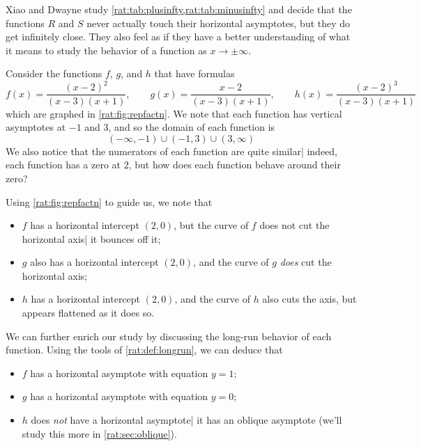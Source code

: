 \begin{pccexample}
		 Xiao and Dwayne study \cref{rat:tab:plusinfty,rat:tab:minusinfty} and decide that
		 the functions $R$ and $S$ never actually touch their horizontal asymptotes, but they
		 do get infinitely close. They also feel as if they have a better understanding of
		 what it means to study the behavior of a function as $x\rightarrow\pm\infty$.
	 \end{pccexample}

	 \begin{pccexample}
		 Consider the functions $f$, $g$, and $h$ that have formulas
		 \[
			 f(x)=\frac{(x-2)^2}{(x-3)(x+1)}, \qquad g(x)=\frac{x-2}{(x-3)(x+1)}, \qquad h(x)=\frac{(x-2)^3}{(x-3)(x+1)}
		 \]
		 which are graphed in \cref{rat:fig:repfactn}. We note that each function has vertical
		 asymptotes at $-1$ and $3$, and so the domain of each function is
		 \[
			 (-\infty,-1)\cup(-1,3)\cup(3,\infty)
		 \]
		 We also notice that the numerators of each function are quite similar| indeed, each
		 function has a zero at $2$, but how does each function behave around their zero?

		 Using \cref{rat:fig:repfactn} to guide us, we note that
		 \begin{itemize}
			 \item $f$ has a horizontal intercept $(2,0)$, but the curve of
			       $f$ does not cut the horizontal axis| it bounces off it;
			 \item $g$ also has a horizontal intercept $(2,0)$, and the curve
			       of $g$ \emph{does} cut the horizontal axis;
			 \item $h$ has a horizontal intercept $(2,0)$, and the curve of $h$
			       also cuts the axis, but appears flattened as it does so.
		 \end{itemize}

		 We can further enrich our study by discussing the long-run behavior of each function.
		 Using the tools of \cref{rat:def:longrun}, we can deduce that
		 \begin{itemize}
			 \item $f$ has a horizontal asymptote with equation $y=1$;
			 \item $g$ has a horizontal asymptote with equation $y=0$;
			 \item $h$ does \emph{not} have a horizontal asymptote| it has an oblique asymptote (we'll
			       study this more in \cref{rat:sec:oblique}).
		 \end{itemize}
	 \end{pccexample}

